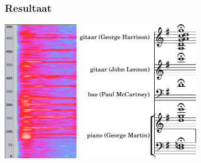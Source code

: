 \documentclass[compress, darktitle, framenumber, totalframenumber]{beamer}
\begin{document}
\begin{frame}
  \frametitle{Resultaat}

  \begin{center}
    \includegraphics[height=6cm]{images/beatles-500}
    \qquad
    \includegraphics[height=6cm]{scores/chord-cropped}
  \end{center}
\end{frame}
\end{document}
